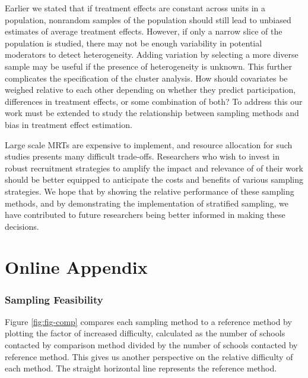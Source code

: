 \documentclass[
  english,
  man,floatsintext]{apa6}
\begin{document}
Earlier we stated that if treatment effects are constant across units in a population, nonrandom samples of the population should still lead to unbiased estimates of average treatment effects. However, if only a narrow slice of the population is studied, there may not be enough variability in potential moderators to detect heterogeneity. Adding variation by selecting a more diverse sample may be useful if the presence of heterogeneity is unknown. This further complicates the specification of the cluster analysis. How should covariates be weighed relative to each other depending on whether they predict participation, differences in treatment effects, or some combination of both? To address this our work must be extended to study the relationship between sampling methods and bias in treatment effect estimation.

Large scale MRTs are expensive to implement, and resource allocation for such studies presents many difficult trade-offs. Researchers who wish to invest in robust recruitment strategies to amplify the impact and relevance of of their work should be better equipped to anticipate the costs and benefits of various sampling strategies. We hope that by showing the relative performance of these sampling methods, and by demonstrating the implementation of stratified sampling, we have contributed to future researchers being better informed in making these decisions.

\hypertarget{online-appendix}{%
\section{Online Appendix}\label{online-appendix}}

\hypertarget{sampling-feasibility}{%
\subsubsection{Sampling Feasibility}\label{sampling-feasibility}}

Figure \ref{fig:fig-comp} compares each sampling method to a reference method by plotting the factor of increased difficulty, calculated as the number of schools contacted by comparison method divided by the number of schools contacted by reference method. This gives us another perspective on the relative difficulty of each method. The straight horizontal line represents the reference method.
\end{document}
